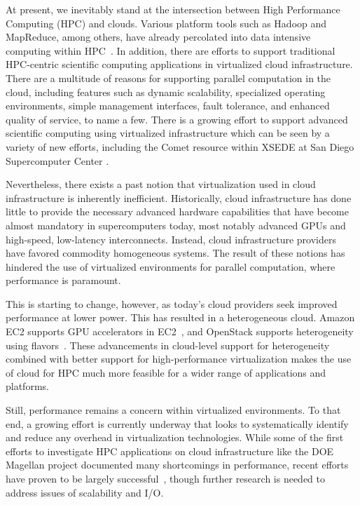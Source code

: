 \documentclass[10pt]{sigplanconf}
\begin{document}
At present, we inevitably stand at the intersection between High Performance Computing (HPC) and clouds. Various platform tools such as Hadoop and MapReduce, among others, have already percolated into data intensive computing within HPC~\cite{jha2014apache}.  In addition, there are efforts to support traditional HPC-centric scientific computing applications in virtualized cloud infrastructure.  There are a multitude of reasons for supporting parallel computation in the cloud\cite{Armbrust2010}, including features such as dynamic scalability, specialized operating environments, simple management interfaces, fault tolerance, and enhanced quality of service, to name a few. There is a growing effort to support advanced scientific computing using virtualized infrastructure which can be seen by a variety of new efforts, including the Comet resource within XSEDE at San Diego Supercomputer Center \cite{moore2014gateways}.  

Nevertheless, there exists a past notion that virtualization used in 
cloud infrastructure is inherently inefficient.  Historically, cloud
infrastructure has done little to provide the necessary advanced hardware
capabilities that have become almost mandatory in supercomputers today, most
notably advanced GPUs and high-speed, low-latency interconnects.  Instead, cloud
infrastructure providers have favored commodity homogeneous systems.  The result
of these notions has hindered the use of virtualized environments for parallel
computation, where performance is paramount.

This is starting to change, however, as today's cloud providers seek improved
performance at lower power.  This has resulted in a heterogeneous cloud.
Amazon EC2 supports GPU accelerators in EC2~\cite{www-amazon-gpu}, and
OpenStack supports heterogeneity using flavors~\cite{www-openstack-flavors}.
These advancements in cloud-level support for heterogeneity combined with better
support for high-performance virtualization makes the use of cloud for HPC much
more feasible for a wider range of applications and platforms.

Still, performance remains a concern within virtualized environments.  To that
end, a growing effort is currently underway that looks to systematically identify and
reduce any overhead in virtualization technologies.  While some of the first efforts to investigate HPC applications on cloud infrastructure like the DOE Magellan project \cite{yelick2011magellan} documented many shortcomings in performance, recent efforts have proven to be largely successful~\cite{Younge2011cloud, Luszczek:2011:EHC}, though further research is needed to address
issues of scalability and I/O.  
\end{document}
